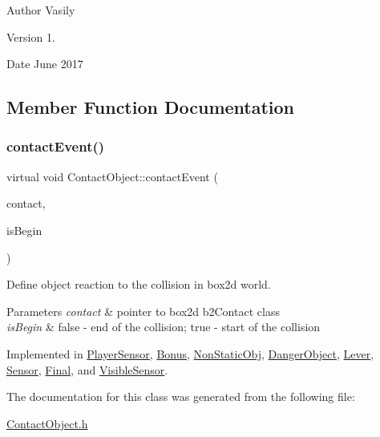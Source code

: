 \begin{DoxyAuthor}{Author}
Vasily 
\end{DoxyAuthor}
\begin{DoxyVersion}{Version}
1. 
\end{DoxyVersion}
\begin{DoxyDate}{Date}
June 2017 
\end{DoxyDate}


\subsection{Member Function Documentation}
\mbox{\label{class_contact_object_a53d2dfc1d9c2821e9c62e80ce62a6435}} 
\subsubsection{\texorpdfstring{contact\+Event()}{contactEvent()}}
{\footnotesize\ttfamily virtual void Contact\+Object\+::contact\+Event (\begin{DoxyParamCaption}\item[{b2\+Contact $\ast$}]{contact,  }\item[{bool}]{is\+Begin }\end{DoxyParamCaption})\hspace{0.3cm}{\ttfamily [pure virtual]}}



Define object reaction to the collision in box2d world. 


\begin{DoxyParams}{Parameters}
{\em contact} & pointer to box2d b2\+Contact class \\
\hline
{\em is\+Begin} & \textquotesingle{}false\textquotesingle{} -\/ end of the collision; \textquotesingle{}true\textquotesingle{} -\/ start of the collision \\
\hline
\end{DoxyParams}


Implemented in \hyperlink{class_player_sensor_a6977b8699ebf0d3d2d2b177665060f21}{Player\+Sensor}, \hyperlink{class_bonus_a903865168ff7fd91e0e2de23f849c553}{Bonus}, \hyperlink{class_non_static_obj_ae129119384cf9df2b7b1a7849b6112de}{Non\+Static\+Obj}, \hyperlink{class_danger_object_aebfc6b5b3dc2452cae78b157a29e8824}{Danger\+Object}, \hyperlink{class_lever_a9ec153b4c960d0a187539cc8f07e5bd9}{Lever}, \hyperlink{class_sensor_a08bfa36c84277677f3bd5fb14127fca7}{Sensor}, \hyperlink{class_final_a9ebc21296dd28e993f2ee8cbb47a3b37}{Final}, and \hyperlink{class_visible_sensor_a63bcb9da7556a6356cca3b08f7808bd8}{Visible\+Sensor}.



The documentation for this class was generated from the following file\+:\begin{DoxyCompactItemize}
\item 
\hyperlink{_contact_object_8h}{Contact\+Object.\+h}\end{DoxyCompactItemize}
